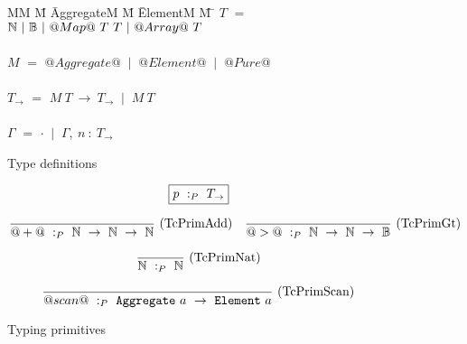 
\begin{figure}

\begin{tabbing}
MM \= M \= AggregateM \= M \= ElementM \= M \= \kill
$T$
    \> $=$  \> $\mathbb{N}~|~\mathbb{B}~|~@Map@~T~T~|~@Array@~T$ \\
\\
$M$
    \> $=$  \> $@Aggregate@$
    \> $~|~$ \> $@Element@$
    \> $~|~$ \> $@Pure@$         \\
\\
$T_{\to}$
    \> $=$  
            \> $M~T~\to~T_{\to}$
            \> $~|~$
            \> $M~T$ \\
\\
$\Gamma$
    \> $=$  
            \> $\cdot$
            \> $~|~$
            \> $\Gamma,~n~:~T_\to$ \\
\end{tabbing}

\caption{Type definitions}
\label{fig:source:type:defs}
\end{figure}


\begin{figure}

$$
\boxed{p ~:_{P}~ T_\to}
$$


$$
\frac {\displaystyle 
} {\displaystyle  
    @+@ ~:_{P}~ \mathbb{N}~\to~\mathbb{N}~\to~\mathbb{N}
} \ 
\textrm{(TcPrimAdd)}
\quad
\frac {\displaystyle 
} {\displaystyle 
    @>@ ~:_{P}~ \mathbb{N}~\to~\mathbb{N}~\to~\mathbb{B}
} \ 
\textrm{(TcPrimGt)}
$$

$$
\frac {\displaystyle 
} {\displaystyle  
    \mathbb{N} ~:_{P}~ \mathbb{N}
} \ 
\textrm{(TcPrimNat)}
$$

$$
\frac {\displaystyle 
} {\displaystyle  
    @scan@ ~:_{P}~ \mathtt{Aggregate}~a~\to~\mathtt{Element}~a
} \ 
\textrm{(TcPrimScan)}
$$

\caption{Typing primitives}
\label{fig:source:type:prim}
\end{figure}


